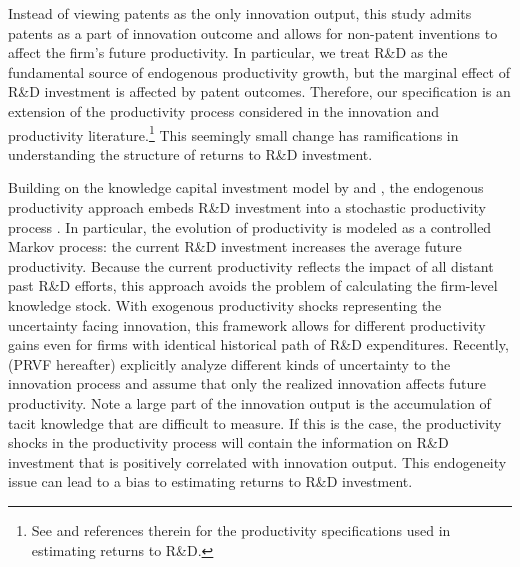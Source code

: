 \documentclass[English]{article}
\begin{document}
Instead of viewing patents as the only innovation output, this study admits patents as a part of innovation outcome and allows for non-patent inventions to affect the firm's future productivity. In particular, we treat R\&D as the fundamental source of endogenous productivity growth, but the marginal effect of R\&D investment is affected by patent outcomes. Therefore, our specification is an extension of the productivity process considered in the innovation and productivity literature.\footnote{See \cite{Hall2010} and references therein for the productivity specifications used in estimating returns to R\&D.} This seemingly small change has ramifications in understanding the structure of returns to R\&D investment. 

Building on the knowledge capital investment model by \cite{hall1989research} and \cite{klette1996r}, the endogenous productivity approach embeds R\&D investment into a stochastic productivity process \citep{Awetal.2011, Doraszelski2013, Peters2017}. In particular, the evolution of productivity is modeled as a controlled Markov process: the current R\&D investment increases the average future productivity. Because the current productivity reflects the impact of all distant past R\&D efforts, this approach avoids the problem of calculating the firm-level knowledge stock. With exogenous productivity shocks representing the uncertainty facing innovation, this framework allows for different productivity gains even for firms with identical historical path of R\&D expenditures. Recently, \cite{Peters2017} (PRVF hereafter) explicitly analyze different kinds of uncertainty to the innovation process and assume that only the realized innovation affects future productivity. Note a large part of the innovation output is the accumulation of tacit knowledge that are difficult to measure. If this is the case, the productivity shocks in the productivity process will contain the information on R\&D investment that is positively correlated with innovation output. This endogeneity issue can lead to a bias to estimating returns to R\&D investment. 
\end{document}
